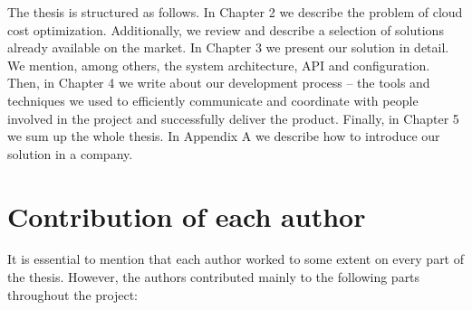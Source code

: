 \documentclass[licencjacka,en]{thesisclass}
\begin{document}
    The thesis is structured as follows.
    In Chapter 2 we describe the problem of cloud cost optimization.
    Additionally, we review and describe a selection of solutions already available
    on the market.
    In Chapter 3 we present our solution in detail.
    We mention, among others, the system architecture, API and configuration.
    Then, in Chapter 4 we write about our development process -- the tools and techniques
    we used to efficiently communicate and coordinate with people involved in the project
    and successfully deliver the product.
    Finally, in Chapter 5 we sum up the whole thesis.
    In Appendix A we describe how to introduce our solution in a company.

    \section{Contribution of each author}

    It is essential to mention that each author worked to some extent on every part of the thesis.
    However, the authors contributed mainly to the following parts throughout the project:
\end{document}
